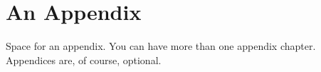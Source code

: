 \cleardoubleoddpage%
\chapter{An Appendix}
\label{app:an-appendix}

Space for an appendix.
You can have more than one appendix chapter.
Appendices are, of course, optional.



